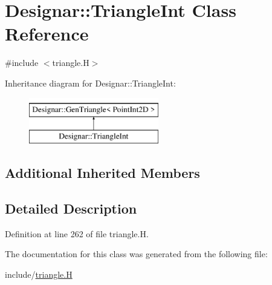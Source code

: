 \hypertarget{class_designar_1_1_triangle_int}{}\section{Designar\+:\+:Triangle\+Int Class Reference}
\label{class_designar_1_1_triangle_int}


{\ttfamily \#include $<$triangle.\+H$>$}

Inheritance diagram for Designar\+:\+:Triangle\+Int\+:\begin{figure}[H]
\begin{center}
\leavevmode
\includegraphics[height=2.000000cm]{class_designar_1_1_triangle_int}
\end{center}
\end{figure}
\subsection*{Additional Inherited Members}


\subsection{Detailed Description}


Definition at line 262 of file triangle.\+H.



The documentation for this class was generated from the following file\+:\begin{DoxyCompactItemize}
\item 
include/\hyperlink{triangle_8_h}{triangle.\+H}\end{DoxyCompactItemize}
